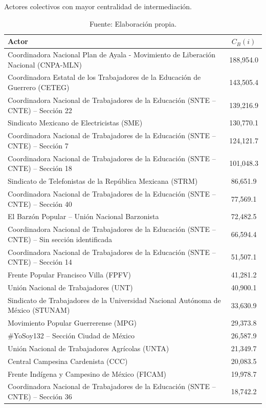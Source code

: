 \documentclass[letterpaper, 11pt]{book}
\theoremstyle{definition}
\theoremstyle{remark}
\begin{document}
\begin{table}[!hbt]
\center
\scriptsize
\caption{Actores colectivos con mayor centralidad de intermediación.}
\label{Actores_con_mayor_CB}
\begin{tabular}{ | l | c | } 
\hline
\hspace{19em} \textbf{Actor} & \textbf{$C_{B}(i)$}\\
\hline
Coordinadora Nacional Plan de Ayala - Movimiento de Liberación Nacional (CNPA-MLN) & 188,954.0\\ \hline
Coordinadora Estatal de los Trabajadores de la Educación de Guerrero (CETEG) & 143,505.4\\ \hline
Coordinadora Nacional de Trabajadores de la Educación (SNTE – CNTE) – Sección 22 & 139,216.9\\ \hline
Sindicato Mexicano de Electricistas (SME) & 130,770.1\\ \hline
Coordinadora Nacional de Trabajadores de la Educación (SNTE – CNTE) – Sección 7 & 124,121.7\\ \hline
Coordinadora Nacional de Trabajadores de la Educación (SNTE – CNTE) – Sección 18 & 101,048.3\\ \hline
Sindicato de Telefonistas de la República Mexicana (STRM) & 86,651.9\\ \hline
Coordinadora Nacional de Trabajadores de la Educación (SNTE – CNTE) – Sección 40 & 77,569.1\\ \hline
El Barzón Popular – Unión Nacional Barzonista & 72,482.5\\ \hline
Coordinadora Nacional de Trabajadores de la Educación (SNTE – CNTE) – Sin sección identificada & 66,594.4\\ \hline
Coordinadora Nacional de Trabajadores de la Educación (SNTE – CNTE) – Sección 14 & 51,507.1\\ \hline
Frente Popular Francisco Villa (FPFV) & 41,281.2\\ \hline
Unión Nacional de Trabajadores (UNT) & 40,900.1\\ \hline
Sindicato de Trabajadores de la Universidad Nacional Autónoma de México (STUNAM) & 33,630.9\\ \hline
Movimiento Popular Guerrerense (MPG) & 29,373.8\\ \hline
\#YoSoy132 – Sección Ciudad de México & 26,587.9\\ \hline
Unión Nacional de Trabajadores Agrícolas (UNTA) & 21,349.7\\ \hline
Central Campesina Cardenista (CCC) & 20,083.5\\ \hline
Frente Indígena y Campesino de México (FICAM) & 19,978.7\\ \hline
Coordinadora Nacional de Trabajadores de la Educación (SNTE – CNTE) – Sección 36 & 18,742.2\\ \hline
\end{tabular}
\par\bigskip
\caption*{\small Fuente: Elaboración propia.}
\end{table}
\end{document}
